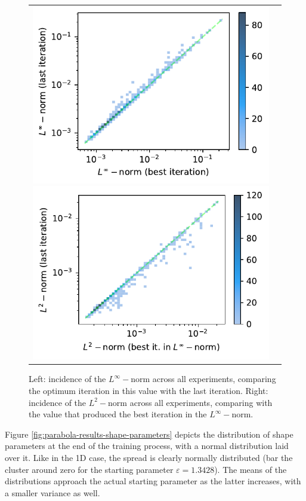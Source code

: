 \documentclass[12pt]{report} %
\begin{document}
\begin{figure}[h]
  \hspace*{-2cm}
  \begin{tabular}{cc}
    \includegraphics[width=.6\textwidth]{imagenes/experiments/2d/statistical_2d_full_scheduler_interpolation/parabola/incidence_of_linf.pdf}
    \includegraphics[width=.6\textwidth]{imagenes/experiments/2d/statistical_2d_full_scheduler_interpolation/parabola/incidence_of_l2.pdf}
  \end{tabular}
  \caption{Left: incidence of the $L^\infty-$norm across all experiments, comparing the optimum iteration in this value with the last iteration. Right: incidence of the $L^2-$norm across all experiments, comparing with the value that produced the best iteration in the $L^\infty-$norm.}
  \label{fig:parabola-results-incidence-l-norms}
\end{figure}

Figure \ref{fig:parabola-results-shape-parameters} depicts the distribution of shape parameters at the end of the training process, with a normal distribution laid over it. Like in the 1D case, the spread is clearly normally distributed (bar the cluster around zero for the starting parameter $\varepsilon=1.3428$). The means of the distributions approach the actual starting parameter as the latter increases, with a smaller variance as well.
\end{document}
